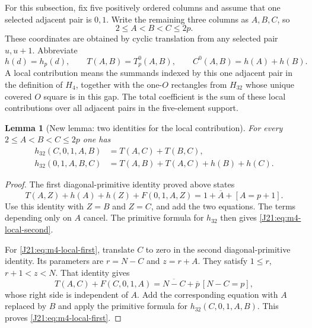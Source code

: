\documentclass[11pt,oneside]{report}
\newtheorem{lemma}[theorem]{Lemma}
\theoremstyle{definition}
\numberwithin{equation}{section}
\begin{document}
For this subsection, fix five positively ordered columns and assume that
one selected adjacent pair is $0,1$. Write the remaining three columns
as $A,B,C$, so
\[
                       2\leq A<B<C\leq2p.
\]
These coordinates are obtained by cyclic translation from any selected
pair $u,u+1$. Abbreviate
\[
 h(d)=h_p(d),\qquad T(A,B)=T_p^0(A,B),\qquad
 C^0(A,B)=h(A)+h(B).
\]
A local contribution means the summands indexed by this one adjacent
pair in the definition of $H_4$, together with the one-$O$ rectangles
from $H_{32}$ whose unique covered $O$ square is in this gap.
The total coefficient is the sum of these local contributions over all
adjacent pairs in the five-element support.

\begin{lemma}[New lemma: two identities for the local contribution]
\label{J21:lem:m4-local-two-identities}
For every $2\leq A<B<C\leq2p$ one has
\begin{align}
 h_{32}(C,0,1,A,B)&=T(A,C)+T(B,C),
                                  \label{J21:eq:m4-local-first}\\
 h_{32}(0,1,A,B,C)&=T(A,B)+T(A,C)+h(B)+h(C).
                                  \label{J21:eq:m4-local-second}
\end{align}
\end{lemma}
\begin{proof}
The first diagonal-primitive identity proved above states
\[
             T(A,Z)+h(A)+h(Z)+F(0,1,A,Z)
                   =1+\overline A+[A=p+1].
\]
Use this identity with $Z=B$ and $Z=C$, and add the two equations.
The terms depending only on $A$ cancel. The primitive formula for
$h_{32}$ then gives \eqref{J21:eq:m4-local-second}.

For \eqref{J21:eq:m4-local-first}, translate $C$ to zero in the second
diagonal-primitive identity. Its parameters are
$r=N-C$ and $z=r+A$. They satisfy $1\leq r$, $r+1<z<N$.
That identity gives
\[
 T(A,C)+F(C,0,1,A)
             =\overline{N-C}+\overline p\,[N-C=p],
\]
whose right side is independent of $A$. Add the corresponding equation
with $A$ replaced by $B$ and apply the primitive formula for
$h_{32}(C,0,1,A,B)$. This proves \eqref{J21:eq:m4-local-first}.
\end{proof}
\end{document}
